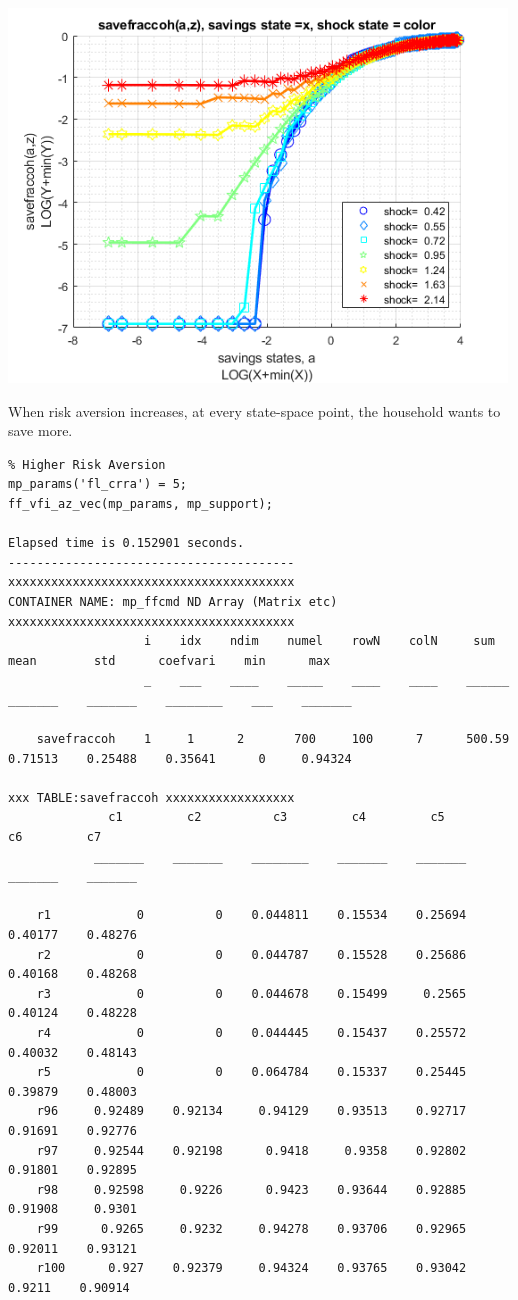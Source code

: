 \documentclass[
]{book}
\begin{document}
\includegraphics[width=5.20833in,height=\textheight]{img/fx_vfi_az_vec_images/figure_3.png}

When risk aversion increases, at every state-space point, the household
wants to save more.

\begin{verbatim}
% Higher Risk Aversion
mp_params('fl_crra') = 5;
ff_vfi_az_vec(mp_params, mp_support);

Elapsed time is 0.152901 seconds.
----------------------------------------
xxxxxxxxxxxxxxxxxxxxxxxxxxxxxxxxxxxxxxxx
CONTAINER NAME: mp_ffcmd ND Array (Matrix etc)
xxxxxxxxxxxxxxxxxxxxxxxxxxxxxxxxxxxxxxxx
                   i    idx    ndim    numel    rowN    colN     sum       mean        std      coefvari    min      max  
                   _    ___    ____    _____    ____    ____    ______    _______    _______    ________    ___    _______

    savefraccoh    1     1      2       700     100      7      500.59    0.71513    0.25488    0.35641      0     0.94324

xxx TABLE:savefraccoh xxxxxxxxxxxxxxxxxx
              c1         c2          c3         c4         c5         c6         c7   
            _______    _______    ________    _______    _______    _______    _______

    r1            0          0    0.044811    0.15534    0.25694    0.40177    0.48276
    r2            0          0    0.044787    0.15528    0.25686    0.40168    0.48268
    r3            0          0    0.044678    0.15499     0.2565    0.40124    0.48228
    r4            0          0    0.044445    0.15437    0.25572    0.40032    0.48143
    r5            0          0    0.064784    0.15337    0.25445    0.39879    0.48003
    r96     0.92489    0.92134     0.94129    0.93513    0.92717    0.91691    0.92776
    r97     0.92544    0.92198      0.9418     0.9358    0.92802    0.91801    0.92895
    r98     0.92598     0.9226      0.9423    0.93644    0.92885    0.91908     0.9301
    r99      0.9265     0.9232     0.94278    0.93706    0.92965    0.92011    0.93121
    r100      0.927    0.92379     0.94324    0.93765    0.93042     0.9211    0.90914
\end{verbatim}
\end{document}
